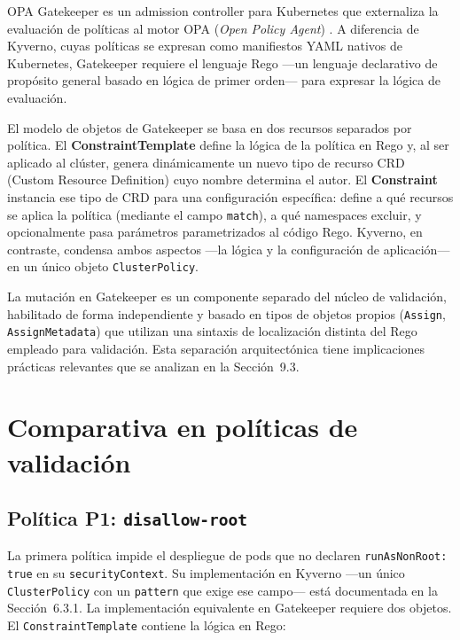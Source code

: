 OPA Gatekeeper \cite{gatekeeper_docs} es un admission controller para Kubernetes que externaliza la evaluación de políticas al motor OPA (\textit{Open Policy Agent}) \cite{opa_docs}. A diferencia de Kyverno, cuyas políticas se expresan como manifiestos YAML nativos de Kubernetes, Gatekeeper requiere el lenguaje Rego \cite{rego_docs} ---un lenguaje declarativo de propósito general basado en lógica de primer orden--- para expresar la lógica de evaluación.

El modelo de objetos de Gatekeeper se basa en dos recursos separados por política. El \textbf{ConstraintTemplate} define la lógica de la política en Rego y, al ser aplicado al clúster, genera dinámicamente un nuevo tipo de recurso CRD (Custom Resource Definition) cuyo nombre determina el autor. El \textbf{Constraint} instancia ese tipo de CRD para una configuración específica: define a qué recursos se aplica la política (mediante el campo \texttt{match}), a qué namespaces excluir, y opcionalmente pasa parámetros parametrizados al código Rego. Kyverno, en contraste, condensa ambos aspectos ---la lógica y la configuración de aplicación--- en un único objeto \texttt{ClusterPolicy}.

La mutación en Gatekeeper \cite{gatekeeper_mutation} es un componente separado del núcleo de validación, habilitado de forma independiente y basado en tipos de objetos propios (\texttt{Assign}, \texttt{AssignMetadata}) que utilizan una sintaxis de localización distinta del Rego empleado para validación. Esta separación arquitectónica tiene implicaciones prácticas relevantes que se analizan en la Sección~9.3.

\section{Comparativa en políticas de validación}

\subsection{Política P1: \texttt{disallow-root}}

La primera política impide el despliegue de pods que no declaren \texttt{runAsNonRoot:\,true} en su \texttt{securityContext}. Su implementación en Kyverno ---un único \texttt{ClusterPolicy} con un \texttt{pattern} que exige ese campo--- está documentada en la Sección~6.3.1. La implementación equivalente en Gatekeeper requiere dos objetos. El \texttt{ConstraintTemplate} contiene la lógica en Rego:

